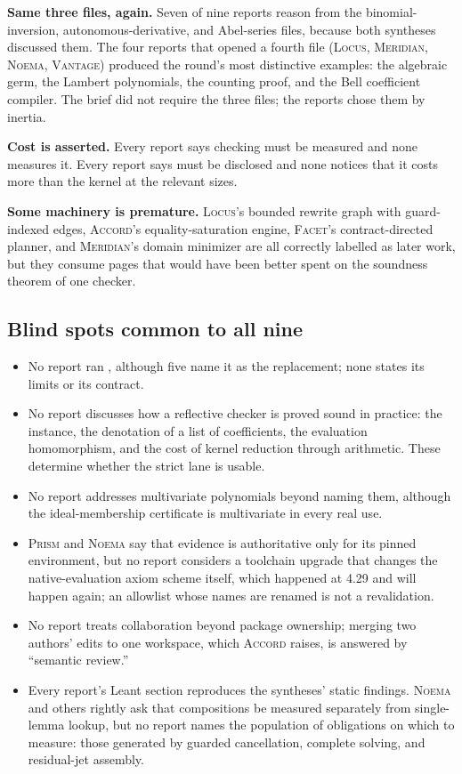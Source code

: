 \documentclass[11pt,a4paper]{article}
\newcommand{\code}[1]{\texttt{\detokenize{#1}}}
\newcommand{\Lc}{\textsc{Locus}}
\newcommand{\Ac}{\textsc{Accord}}
\newcommand{\Fc}{\textsc{Facet}}
\newcommand{\Md}{\textsc{Meridian}}
\newcommand{\Nm}{\textsc{Noema}}
\newcommand{\Pm}{\textsc{Prism}}
\newcommand{\Vt}{\textsc{Vantage}}
\theoremstyle{definition}
\begin{document}
\textbf{Same three files, again.} Seven of nine reports reason from the binomial-inversion, autonomous-derivative, and Abel-series files, because both syntheses discussed them. The four reports that opened a fourth file (\Lc, \Md, \Nm, \Vt) produced the round's most distinctive examples: the algebraic germ, the Lambert polynomials, the counting proof, and the Bell coefficient compiler. The brief did not require the three files; the reports chose them by inertia.

\textbf{Cost is asserted.} Every report says checking must be measured and none measures it. Every report says \code{native_decide} must be disclosed and none notices that it costs more than the kernel at the relevant sizes.

\textbf{Some machinery is premature.} \Lc's bounded rewrite graph with guard-indexed edges, \Ac's equality-saturation engine, \Fc's contract-directed planner, and \Md's domain minimizer are all correctly labelled as later work, but they consume pages that would have been better spent on the soundness theorem of one checker.

\subsection{Blind spots common to all nine}
\begin{itemize}
\item No report ran \code{grobner}, although five name it as the \code{polyrith} replacement; none states its limits or its contract.
\item No report discusses how a reflective checker is proved sound in practice: the \code{Decidable} instance, the denotation of a list of coefficients, the evaluation homomorphism, and the cost of kernel reduction through \code{Int} arithmetic. These determine whether the strict lane is usable.
\item No report addresses multivariate polynomials beyond naming them, although the ideal-membership certificate is multivariate in every real use.
\item \Pm{} and \Nm{} say that evidence is authoritative only for its pinned environment, but no report considers a toolchain upgrade that changes the native-evaluation axiom scheme itself, which happened at 4.29 and will happen again; an allowlist whose names are renamed is not a revalidation.
\item No report treats collaboration beyond package ownership; merging two authors' edits to one workspace, which \Ac{} raises, is answered by ``semantic review.''
\item Every report's Leant section reproduces the syntheses' static findings. \Nm{} and others rightly ask that compositions be measured separately from single-lemma lookup, but no report names the population of obligations on which to measure: those generated by guarded cancellation, complete solving, and residual-jet assembly.
\end{itemize}
\end{document}
